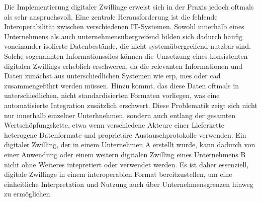 


Die Implementierung digitaler Zwillinge erweist sich in der Praxis jedoch oftmals als sehr anspruchsvoll.
Eine zentrale Herausforderung ist die fehlende Interoperabilität zwischen verschiedenen IT-Systemen.
Sowohl innerhalb eines Unternehmens als auch unternehmensübergreifend bilden sich dadurch häufig voneinander isolierte Datenbestände, die nicht systemübergreifend nutzbar sind.
Solche sogenannten Informationssilos können die Umsetzung eines konsistenten digitalen Zwillings erheblich erschweren, da die relevanten Informationen und Daten zunächst aus unterschiedlichen Systemen wie \ac{erp}, \ac{mes} oder \ac{cad} zusammengeführt werden müssen.
Hinzu kommt, das diese Daten oftmals in unterschiedlichen, nicht standardisierten Formaten vorliegen, was eine automatisierte Integration zusätzlich erschwert.
Diese Problematik zeigt sich nicht nur innerhalb einzelner Unterhnehmen, sondern auch entlang der gesamten Wertschöpfungskette, etwa wenn verschiedene Akteure einer Lieferkette heterogene Datenformate und proprietäre Austauschprotokolle verwenden.
Ein digitaler Zwilling, der in einem Unternehmen A erstellt wurde, kann dadurch von einer Anwendung oder einem weitern digitalen Zwilling eines Unternehmens B nicht ohne Weiteres intepretiert oder verwendet werden.
Es ist daher essenziell, digitale Zwillinge in einem interoperablen Format bereitzustellen, um eine einheitliche Interpretation und Nutzung auch über Unternehmensgrenzen hinweg zu ermöglichen.
\cite{DTandAASConceptsInI4.0}



